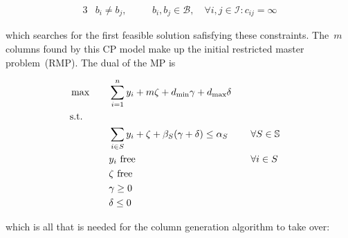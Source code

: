 \documentclass{llncs}
\begin{document}
\begin{alignat}{3}
  & b_{i} \neq b_{j}, \quad && b_{i}, b_{j} \in \mathcal{B}, \quad \forall i, j \in \mathcal{I}:c_{ij}=\infty
\end{alignat}

\noindent which searches for the first feasible solution safisfying these constraints. The~$m$ columns found by this CP model make up the initial restricted master problem~(RMP). The dual of the MP is

\begin{alignat}{3}
  & \max \quad && \sum \limits_{i=1}^{n} y_{i} + m\zeta + d_{\min}\gamma + d_{\max}\delta \\
  &\textrm{s.t.} \notag \\
  &&& \sum \limits_{i \in S} y_{i} + \zeta + \beta_{S}(\gamma + \delta) \leq \alpha_{S} && \quad \forall S \in \mathbb{S} \\
  &&& y_{i} \text{ free} && \quad \forall i \in S \\
  &&& \zeta \text{ free} \\
  &&& \gamma \geq 0 \\
  &&& \delta \leq 0
\end{alignat}

\noindent which is all that is needed for the column generation algorithm to take over:
\end{document}
